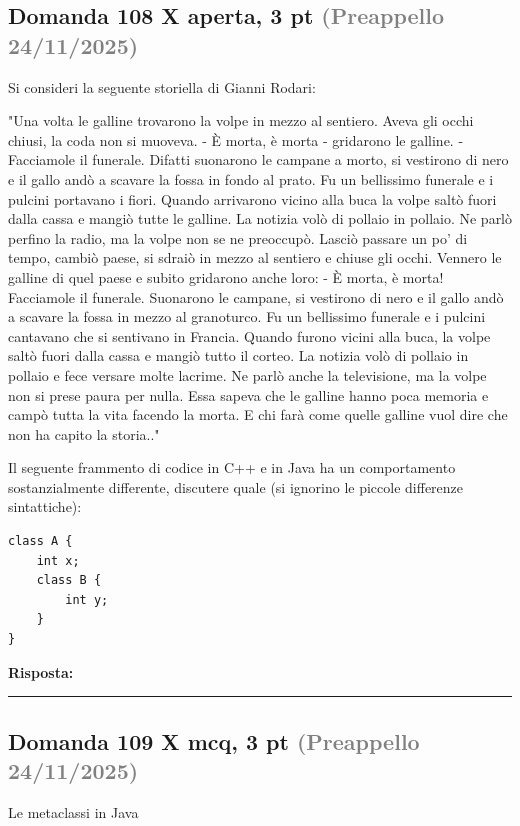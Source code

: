 \documentclass[a4paper,11pt]{article}
\begin{document}
\subsection*{Domanda 108 X \hfill {\small aperta, 3 pt \textcolor{gray}{(Preappello 24/11/2025)}}}
\begin{tcolorbox}[colback=gray!8,colframe=gray!50,title=Contesto]
Si consideri la seguente storiella di Gianni Rodari:

"Una volta le galline trovarono la volpe in mezzo al sentiero. Aveva gli occhi chiusi, la coda non si muoveva. - È morta, è morta - gridarono le galline. - Facciamole il funerale. Difatti suonarono le campane a morto, si vestirono di nero e il gallo andò a scavare la fossa in fondo al prato. Fu un bellissimo funerale e i pulcini portavano i fiori. Quando arrivarono vicino alla buca la volpe saltò fuori dalla cassa e mangiò tutte le galline.
La notizia volò di pollaio in pollaio. Ne parlò perfino la radio, ma la volpe non se ne preoccupò. Lasciò passare un po' di tempo, cambiò paese, si sdraiò in mezzo al sentiero e chiuse gli occhi. Vennero le galline di quel paese e subito gridarono anche loro: - È morta, è morta! Facciamole il funerale.
Suonarono le campane, si vestirono di nero e il gallo andò a scavare la fossa in mezzo al granoturco. Fu un bellissimo funerale e i pulcini cantavano che si sentivano in Francia. Quando furono vicini alla buca, la volpe saltò fuori dalla cassa e mangiò tutto il corteo.
La notizia volò di pollaio in pollaio e fece versare molte lacrime. Ne parlò anche la televisione, ma la volpe non si prese paura per nulla. Essa sapeva che le galline hanno poca memoria e campò tutta la vita facendo la morta. E chi farà come quelle galline vuol dire che non ha capito la storia.."
\end{tcolorbox}
Il seguente frammento di codice in C++ e in Java ha un comportamento sostanzialmente differente, discutere quale (si ignorino le piccole differenze sintattiche):
\begin{verbatim}
class A {
    int x;
    class B {
        int y;
    }
}
\end{verbatim}

\vspace{0.2cm}
\noindent\textbf{Risposta:}\par
\vspace{4cm}\hrule


\subsection*{Domanda 109 X \hfill {\small mcq, 3 pt \textcolor{gray}{(Preappello 24/11/2025)}}}
Le metaclassi in Java
\end{document}

